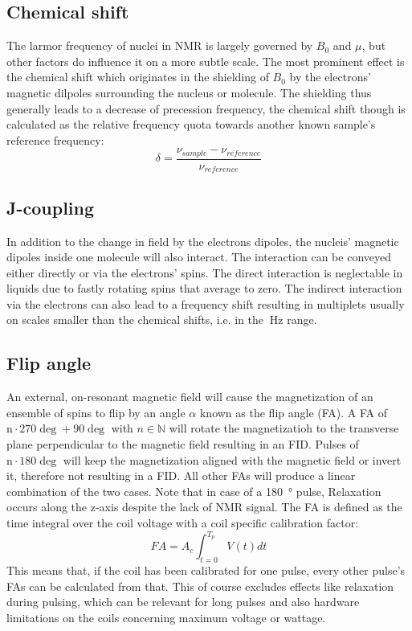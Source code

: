        \subsection{Chemical shift}
            The larmor frequency of nuclei in NMR is largely governed by $B_0$ and $\mu$, but other factors do
            influence it on a more subtle scale. The most prominent effect is the chemical shift which
            originates in the shielding of $B_0$ by the electrons' magnetic dilpoles surrounding the nucleus or molecule.
            The shielding thus generally leads to a decrease of precession frequency, the chemical shift
            though is calculated as the relative frequency quota towards another known sample's
            reference frequency:
            \begin{equation}
                \delta = \frac{\nu_{sample} - \nu_{reference}}{\nu_{reference}}
            \end{equation}
        \subsection{J-coupling}
            In addition to the change in field by the electrons dipoles, the nucleis' magnetic dipoles inside one molecule will also interact. The interaction can be conveyed either directly or via the electrons' spins. The direct interaction is neglectable in liquids due to fastly rotating spins that average to zero. The indirect interaction via the electrons can also lead to a frequency shift resulting in multiplets usually on scales smaller than the chemical shifts, i.e. in the $\SI{}{\hertz}$ range.
        \subsection{Flip angle}
            An external, on-resonant magnetic field will cause the magnetization of an ensemble of spins to flip by an angle $\alpha$ known as the flip angle (FA). A FA of $\mathrm n\cdot 270 \deg + 90 \deg$ with $n \in \mathbb{N}$ will rotate the magnetizatioh to the transverse plane perpendicular to the magnetic field resulting in an FID. Pulses of $\mathrm n\cdot 180 \deg$ will keep the magnetization aligned with the magnetic field or invert it, therefore not resulting in a FID. All other FAs will produce a linear combination of the two cases. Note that in case of a \SI{180}{\degree} pulse, Relaxation occurs along the z-axis despite the lack of NMR signal. The FA is defined as the time integral over the coil voltage with a coil specific calibration factor:
            \begin{equation}
                FA = A_c \int_{t=0}^{T_p}{V(t)dt}
            \end{equation}
            This means that, if the coil has been calibrated for one pulse, every other pulse's FAs can be calculated from that. This of course excludes effects like relaxation during pulsing, which can be relevant for long pulses and also hardware limitations on the coils concerning maximum voltage or wattage.
